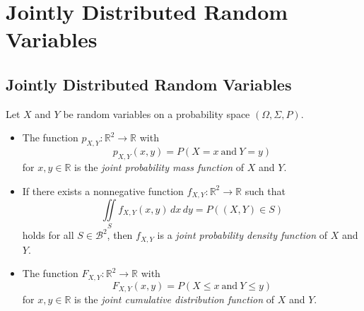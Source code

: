 \chapter{Jointly Distributed Random Variables}
\section{Jointly Distributed Random Variables}
\begin{definition}
  Let $X$ and $Y$ be random variables on a probability space
  $(\Omega, \Sigma, P)$.
  \begin{itemize}
    \item The function $p_{X,Y}: \mathbb{R}^2 \to \mathbb{R}$ with
      \begin{equation*}
        p_{X,Y}(x, y) = P(X = x\ \text{and}\ Y = y)
      \end{equation*}
      for $x, y \in \mathbb{R}$ is the
      \emph{joint probability mass function} of $X$ and $Y$.
    \item If there exists a nonnegative function
      $f_{X,Y}: \mathbb{R}^2 \to \mathbb{R}$ such that
      \begin{equation*}
        \iint\limits_S f_{X,Y}(x, y)\,dx\,dy
        = P((X, Y) \in S)
      \end{equation*}
      holds for all $S \in \mathcal{B}^2$, then $f_{X,Y}$ is a
      \emph{joint probability density function} of $X$ and $Y$.
    \item The function $F_{X,Y}: \mathbb{R}^2 \to \mathbb{R}$ with
      \begin{equation*}
        F_{X,Y}(x, y) = P(X \leq x\ \text{and}\ Y \leq y)
      \end{equation*}
      for $x, y \in \mathbb{R}$ is the
      \emph{joint cumulative distribution function} of $X$ and $Y$.
  \end{itemize}
\end{definition}
